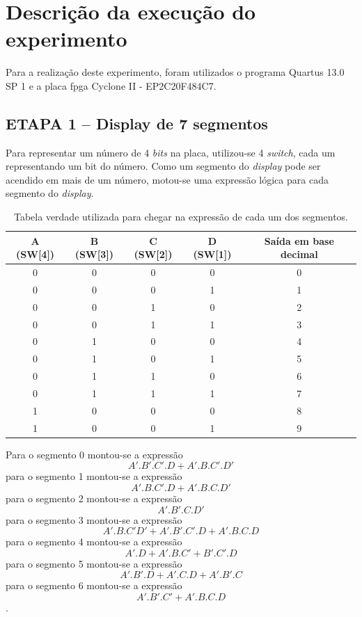 
\chapter{Descrição da execução do experimento}

	Para a realização deste experimento, foram utilizados o programa Quartus 13.0 SP 1 e a placa \ac{fpga}
Cyclone II - EP2C20F484C7.

	\section{ETAPA 1 – Display de 7 segmentos}
		Para representar um número de 4 \textit{bits} na placa, utilizou-se 4 \textit{switch}, cada um
		representando um bit do número. Como um segmento do \textit{display} pode ser acendido
		em mais de um número,
		motou-se uma expressão lógica para cada segmento do \textit{display}.

		\begin{table}[h]
			\centering
			\caption{Tabela verdade utilizada para chegar na expressão de cada um dos segmentos.}
			\label{table:tabelaVerdade1}
			\begin{tabular}{c|c|c|c|c}
				\textbf{A (SW[4])} & \textbf{B (SW[3])} & \textbf{C (SW[2])} & \textbf{D (SW[1])} & \textbf{Saída em base decimal} \\
				\hline
				0 & 0 & 0 & 0 & 0\\
				0 & 0 & 0 & 1 & 1\\
				0 & 0 & 1 & 0 & 2\\
				0 & 0 & 1 & 1 & 3\\
				0 & 1 & 0 & 0 & 4\\
				0 & 1 & 0 & 1 & 5\\
				0 & 1 & 1 & 0 & 6\\
				0 & 1 & 1 & 1 & 7\\
				1 & 0 & 0 & 0 & 8\\
				1 & 0 & 0 & 1 & 9\\
			\end{tabular}
		\end{table}

		Para o segmento 0 montou-se a expressão
		$$A'.B'.C'.D+A'.B.C'.D'$$
		para o segmento 1 montou-se a expressão
		$$A'.B.C'.D+A'.B.C.D'$$
		para o segmento 2 montou-se a expressão
		$$A'.B'.C.D'$$
		para o segmento 3 montou-se a expressão
		$$A'.B.C'D'+A'.B'.C'.D+A'.B.C.D$$
		para o segmento 4 montou-se a expressão
		$$A'.D+A'.B.C'+B'.C'.D$$
		para o segmento 5 montou-se a expressão
		$$A'.B'.D+A'.C.D+A'.B'.C$$
		para o segmento 6 montou-se a expressão
		$$A'.B'.C'+A'.B.C.D$$.

